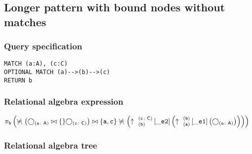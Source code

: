 \subsection{Longer pattern with bound nodes without matches}

\subsubsection*{Query specification}

\begin{lstlisting}
MATCH (a:A), (c:C)
OPTIONAL MATCH (a)-->(b)-->(c)
RETURN b
\end{lstlisting}

\subsubsection*{Relational algebra expression}

$\projection{\var{b}} \left(\alldifferent{} \left(\getvertices{a}{A} \join \{\} \getvertices{c}{C}\right) \join \{\var{a}, \var{c}\} \alldifferent{} \left(\expandout{b}{c}{C}{\_e2}{} \left(\expandout{a}{b}{}{\_e1}{} \left(\getvertices{a}{A}\right)\right)\right)\right)$

\subsubsection*{Relational algebra tree}


